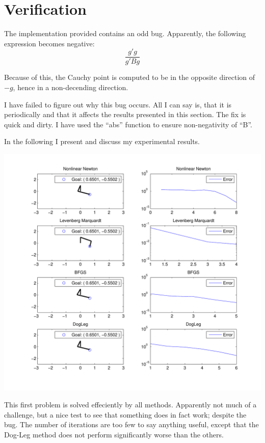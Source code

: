 \documentclass[10pt,oneside,a4paper,final,english]{memoir}
\begin{document}
\section{Verification}
The implementation provided contains an odd bug. Apparently, the
following expression becomes negative:
\[ \frac{g'g}{g'B g} \]

Because of this, the Cauchy point is computed to be in the opposite
direction of $-g$, hence in a non-decending direction.

I have failed to figure out why this bug occurs. All I can say is,
that it is periodically and that it affects the results presented in
this section. The fix is quick and dirty. I have used the ``abs''
function to ensure non-negativity of ``B''.

In the following I present and discuss my experimental results.

\begin{center}
\includegraphics[width=\textwidth]{images/graph0.pdf}
\end{center}

This first problem is solved effeciently by all methods. Apparently
not much of a challenge, but a nice test to see that something does in
fact work; despite the bug. The number of iterations are too few to
say anything useful, except that the Dog-Leg method does not perform
significantly worse than the others.
\end{document}
